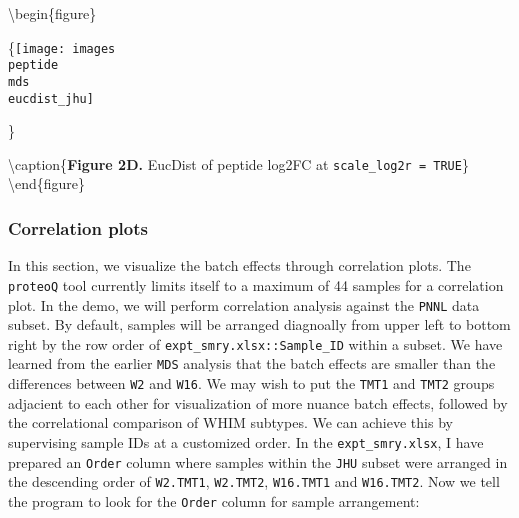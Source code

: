 \documentclass[]{article}
\begin{document}
\textbackslash{}begin\{figure\}

\{\centering \texttt{[image: images\\peptide\\mds\\eucdist\_jhu]}

\}

\textbackslash{}caption\{\textbf{Figure 2D.} EucDist of peptide log2FC
at \texttt{scale\_log2r\ =\ TRUE}\}\label{fig:Peptide_EucDist}
\textbackslash{}end\{figure\}

\hypertarget{correlation-plots}{%
\subsubsection{Correlation plots}\label{correlation-plots}}

In this section, we visualize the batch effects through correlation
plots. The \texttt{proteoQ} tool currently limits itself to a maximum of
44 samples for a correlation plot. In the demo, we will perform
correlation analysis against the \texttt{PNNL} data subset. By default,
samples will be arranged diagnoally from upper left to bottom right by
the row order of \texttt{expt\_smry.xlsx::Sample\_ID} within a subset.
We have learned from the earlier \texttt{MDS} analysis that the batch
effects are smaller than the differences between \texttt{W2} and
\texttt{W16}. We may wish to put the \texttt{TMT1} and \texttt{TMT2}
groups adjacient to each other for visualization of more nuance batch
effects, followed by the correlational comparison of WHIM subtypes. We
can achieve this by supervising sample IDs at a customized order. In the
\texttt{expt\_smry.xlsx}, I have prepared an \texttt{Order} column where
samples within the \texttt{JHU} subset were arranged in the descending
order of \texttt{W2.TMT1}, \texttt{W2.TMT2}, \texttt{W16.TMT1} and
\texttt{W16.TMT2}. Now we tell the program to look for the
\texttt{Order} column for sample arrangement:
\end{document}
